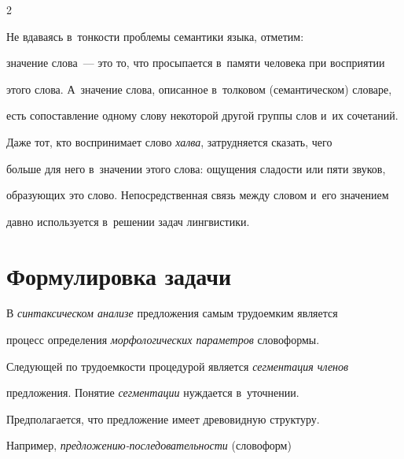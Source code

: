 \begin{multicols}{2}
     


     Не вдаваясь в~тонкости проб\-ле\-мы семантики языка, отметим: 


значение слова~--- это то, что просыпается в~памяти человека при восприятии 


этого слова. А~значение слова, описанное в~толковом (семантическом) словаре, 


есть со\-по\-став\-ле\-ние одному слову некоторой другой группы слов и~их сочетаний.


     


     Даже тот, кто воспринимает слово \textit{халва}, затрудняется сказать, чего 


больше для него в~значении этого слова: ощущения сла\-дости или пяти звуков, 


об\-ра\-зу\-ющих это слово. Непосредственная связь между словом и~его значением 


давно используется в~решении задач лингвистики.





\vspace*{-2pt}


     


\section{Формулировка задачи}





     В \textit{синтаксическом анализе} предложения самым трудоемким является 


процесс определения \textit{морфологических параметров} словоформы. 


Следующей по тру\-до\-ем\-кости процедурой является \textit{сегментация членов} 


предложения. Понятие \textit{сегментации} нуж\-да\-ет\-ся в~уточ\-нении.


     


     Предполагается, что предложение имеет древовидную структуру. 


Например, \textit{пред\-ло\-же\-нию-по\-сле\-до\-ва\-тель\-ности} (словоформ) 





\vspace*{-3pt}






\end{multicols}
